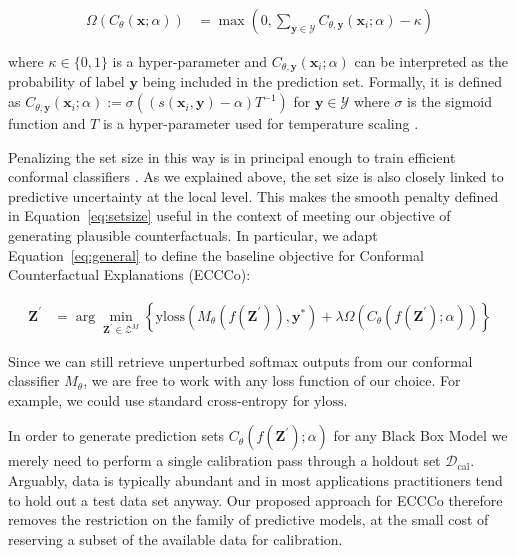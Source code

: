 \documentclass{article}
\begin{document}
\begin{equation}\label{eq:setsize}
  \begin{aligned}
    \Omega(C_{\theta}(\mathbf{x};\alpha))&=\max \left(0, \sum_{\mathbf{y}\in\mathcal{Y}}C_{\theta,\mathbf{y}}(\mathbf{x}_i;\alpha) - \kappa \right)
  \end{aligned}
\end{equation}

where $\kappa \in \{0,1\}$ is a hyper-parameter and $C_{\theta,\mathbf{y}}(\mathbf{x}_i;\alpha)$ can be interpreted as the probability of label $\mathbf{y}$ being included in the prediction set. Formally, it is defined as $C_{\theta,\mathbf{y}}(\mathbf{x}_i;\alpha):=\sigma\left((s(\mathbf{x}_i,\mathbf{y})-\alpha) T^{-1}\right)$ for $\mathbf{y}\in\mathcal{Y}$ where $\sigma$ is the sigmoid function and $T$ is a hyper-parameter used for temperature scaling \citep{stutz2022learning}.

Penalizing the set size in this way is in principal enough to train efficient conformal classifiers \citep{stutz2022learning}. As we explained above, the set size is also closely linked to predictive uncertainty at the local level. This makes the smooth penalty defined in Equation~\ref{eq:setsize} useful in the context of meeting our objective of generating plausible counterfactuals. In particular, we adapt Equation~\ref{eq:general} to define the baseline objective for Conformal Counterfactual Explanations (ECCCo):

\begin{equation}\label{eq:cce}
  \begin{aligned}
    \mathbf{Z}^\prime &= \arg \min_{\mathbf{Z}^\prime \in \mathcal{Z}^M} \left\{  {\text{yloss}(M_{\theta}(f(\mathbf{Z}^\prime)),\mathbf{y}^*)}+ \lambda \Omega(C_{\theta}(f(\mathbf{Z}^\prime);\alpha)) \right\} 
  \end{aligned}
\end{equation}

Since we can still retrieve unperturbed softmax outputs from our conformal classifier $M_{\theta}$, we are free to work with any loss function of our choice. For example, we could use standard cross-entropy for $\text{yloss}$.

In order to generate prediction sets $C_{\theta}(f(\mathbf{Z}^\prime);\alpha)$ for any Black Box Model we merely need to perform a single calibration pass through a holdout set $\mathcal{D}_{\text{cal}}$. Arguably, data is typically abundant and in most applications practitioners tend to hold out a test data set anyway. Our proposed approach for ECCCo therefore removes the restriction on the family of predictive models, at the small cost of reserving a subset of the available data for calibration. 
\end{document}
